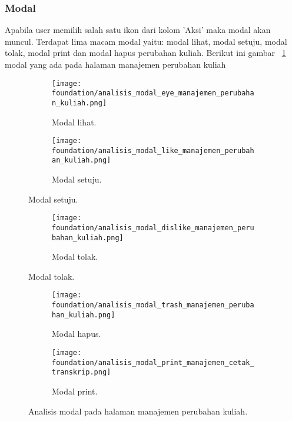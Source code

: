 \subsubsection{Modal}
Apabila user memilih salah satu ikon dari kolom 'Aksi' maka modal akan muncul. Terdapat lima macam modal yaitu: modal lihat, modal setuju, modal tolak, modal print dan modal hapus perubahan kuliah. Berikut ini gambar ~\ref{fig:analisisModalManajemenPerubahanKuliah} modal yang ada pada halaman manajemen perubahan kuliah
\begin{figure} [H]	
	\centering
	\begin{subfigure}[b]{0.45\linewidth} 
		\texttt{[image: foundation/analisis\_modal\_eye\_manajemen\_perubahan\_kuliah.png]}
		\caption{Modal lihat.}  
	\end{subfigure}	
	\begin{subfigure}[b]{0.3\linewidth}   
		\texttt{[image: foundation/analisis\_modal\_like\_manajemen\_perubahan\_kuliah.png]}
		\caption{Modal setuju.}
	\end{subfigure}
\end{figure}

\begin{figure} [H] 
	\centering
	\ContinuedFloat
	\begin{subfigure}[b]{0.6\linewidth}
		\texttt{[image: foundation/analisis\_modal\_dislike\_manajemen\_perubahan\_kuliah.png]}
		\caption{Modal tolak.}  
	\end{subfigure}
\end{figure}

\begin{figure} [H] 
	\centering
	\ContinuedFloat
	\begin{subfigure}[b]{0.35\linewidth} 
		\texttt{[image: foundation/analisis\_modal\_trash\_manajemen\_perubahan\_kuliah.png]}
		\caption{Modal hapus.}
	\end{subfigure}
	\begin{subfigure}[b]{0.55\linewidth}
		\texttt{[image: foundation/analisis\_modal\_print\_manajemen\_cetak\_transkrip.png]}
		\caption{Modal print.}  
	\end{subfigure}	 
\caption{Analisis modal pada halaman manajemen perubahan kuliah.}
\label{fig:analisisModalManajemenPerubahanKuliah}
\end{figure}

